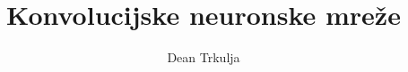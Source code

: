 \documentclass[scrartcl ,times, utf8, seminar]{fer}
\begin{document}
    \title{Konvolucijske neuronske mreže}
    \author{Dean Trkulja}
    \maketitle


    \tableofcontents
    
    
    
    
    
    
    
    
    

\end{document}

